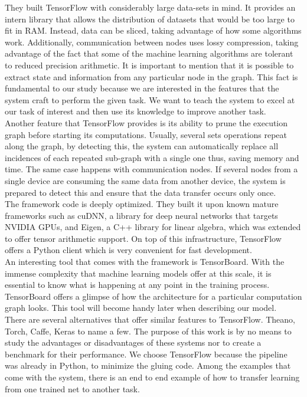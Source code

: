 They built TensorFlow with considerably large data-sets in mind. It provides an intern library that allows the distribution of datasets that would be too large to fit in RAM. Instead, data can be sliced, taking advantage of how some algorithms work. Additionally, communication between nodes uses lossy compression, taking advantage of the fact that some of the machine learning algorithms are tolerant to reduced precision arithmetic. It is important to mention that it is possible to extract state and information from any particular node in the graph. This fact is fundamental to our study because we are interested in the features that the system craft to perform the given task. We want to teach the system to excel at our task of interest and then use its knowledge to improve another task.\\

Another feature that TensorFlow provides is its ability to prune the execution graph before starting its computations. Usually, several sets operations repeat along the graph, by detecting this, the system can automatically replace all incidences of each repeated sub-graph with a single one thus, saving memory and time. The same case happens with communication nodes. If several nodes from a single device are consuming the same data from another device, the system is prepared to detect this and ensure that the data transfer occurs only once.\\

The framework code is deeply optimized. They built it upon known mature frameworks such as cuDNN, a library for deep neural networks that targets NVIDIA GPUs, and Eigen, a C++ library for linear algebra, which was extended to offer tensor arithmetic support. On top of this infrastructure, TensorFlow offers a Python client which is very convenient for fast development.\\

An interesting tool that comes with the framework is TensorBoard. With the immense complexity that machine learning models offer at this scale, it is essential to know what is happening at any point in the training process. TensorBoard offers a glimpse of how the architecture for a particular computation graph looks. This tool will become handy later when describing our model.\\

There are several alternatives that offer similar features to TensorFlow. Theano, Torch, Caffe, Keras to name a few. The purpose of this work is by no means to study the advantages or disadvantages of these systems nor to create a benchmark for their performance. We choose TensorFlow because the pipeline was already in Python,  to minimize the gluing code. Among the examples that come with the system, there is an end to end example of how to transfer learning from one trained net to another task.\\












